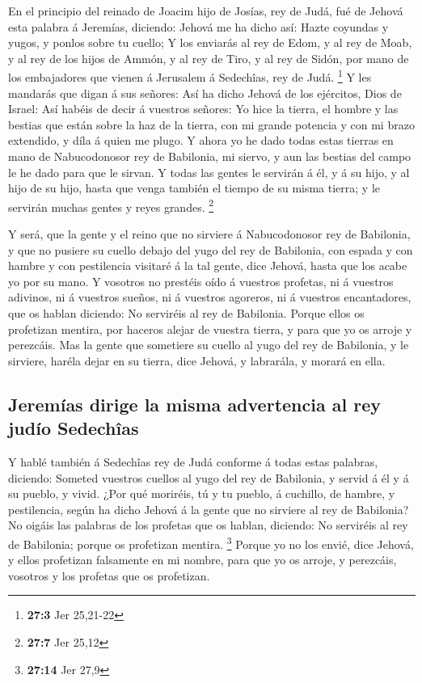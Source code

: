  En el principio del reinado de Joacim hijo de Josías, rey
de Judá, fué de Jehová esta palabra á Jeremías, diciendo: 
Jehová me ha dicho así: Hazte coyundas y yugos, y ponlos sobre tu
cuello;  Y los enviarás al rey de Edom, y al rey de Moab,
y al rey de los hijos de Ammón, y al rey de Tiro, y al rey de Sidón, por
mano de los embajadores que vienen á Jerusalem á Sedechîas, rey de Judá.
\footnote{\textbf{27:3} Jer 25,21-22}  Y les mandarás que
digan á sus señores: Así ha dicho Jehová de los ejércitos, Dios de
Israel: Así habéis de decir á vuestros señores:  Yo hice
la tierra, el hombre y las bestias que están sobre la haz de la tierra,
con mi grande potencia y con mi brazo extendido, y díla á quien me
plugo.  Y ahora yo he dado todas estas tierras en mano de
Nabucodonosor rey de Babilonia, mi siervo, y aun las bestias del campo
le he dado para que le sirvan.  Y todas las gentes le
servirán á él, y á su hijo, y al hijo de su hijo, hasta que venga
también el tiempo de su misma tierra; y le servirán muchas gentes y
reyes grandes. \footnote{\textbf{27:7} Jer 25,12}

 Y será, que la gente y el reino que no sirviere á
Nabucodonosor rey de Babilonia, y que no pusiere su cuello debajo del
yugo del rey de Babilonia, con espada y con hambre y con pestilencia
visitaré á la tal gente, dice Jehová, hasta que los acabe yo por su
mano.  Y vosotros no prestéis oído á vuestros profetas, ni
á vuestros adivinos, ni á vuestros sueños, ni á vuestros agoreros, ni á
vuestros encantadores, que os hablan diciendo: No serviréis al rey de
Babilonia.  Porque ellos os profetizan mentira, por
haceros alejar de vuestra tierra, y para que yo os arroje y perezcáis.
 Mas la gente que sometiere su cuello al yugo del rey de
Babilonia, y le sirviere, haréla dejar en su tierra, dice Jehová, y
labrarála, y morará en ella.

\hypertarget{jeremuxedas-dirige-la-misma-advertencia-al-rey-juduxedo-sedechuxeeas}{%
\subsection{Jeremías dirige la misma advertencia al rey judío
Sedechîas}\label{jeremuxedas-dirige-la-misma-advertencia-al-rey-juduxedo-sedechuxeeas}}

 Y hablé también á Sedechîas rey de Judá conforme á todas
estas palabras, diciendo: Someted vuestros cuellos al yugo del rey de
Babilonia, y servid á él y á su pueblo, y vivid.  ¿Por
qué moriréis, tú y tu pueblo, á cuchillo, de hambre, y pestilencia,
según ha dicho Jehová á la gente que no sirviere al rey de Babilonia?
 No oigáis las palabras de los profetas que os hablan,
diciendo: No serviréis al rey de Babilonia; porque os profetizan
mentira. \footnote{\textbf{27:14} Jer 27,9}  Porque yo no
los envié, dice Jehová, y ellos profetizan falsamente en mi nombre, para
que yo os arroje, y perezcáis, vosotros y los profetas que os
profetizan.


